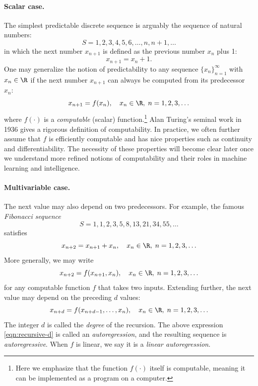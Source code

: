 \documentclass[../../book-main.tex]{subfiles}
\begin{document}
\paragraph{Scalar case.} The simplest predictable discrete sequence
is arguably the sequence of natural numbers:
\begin{equation}
    S = 1, 2, 3, 4, 5, 6, \ldots, n, n+1, \ldots
\end{equation}
in which the next number \(x_{n+1}\) is defined as the previous
number \(x_{n}\) plus 1:
\begin{equation}
    x_{n+1} = x_{n} + 1.
\end{equation}
One may generalize the notion of predictability to any sequence
\(\{x_{n}\}_{n=1}^{\infty}\) with \(x_{n} \in \R\) if the next number
\(x_{n+1}\) can always be computed from its predecessor \(x_{n}\):
\begin{equation}
    x_{n+1} = f(x_{n}), \quad x_{n} \in \R, \; n = 1, 2, 3, \ldots
\end{equation}
where \(f(\cdot)\) is a \textit{computable} (scalar)
function.\footnote{Here we emphasize that the function \(f(\cdot)\)
    itself is computable, meaning it can be implemented as a program on a
computer.} Alan Turing's seminal work in 1936 \cite{Turing-1936}
gives a rigorous definition of computability. In practice, we often
further assume that \(f\) is efficiently computable and has nice
properties such as continuity and differentiability. The necessity of
these properties will become clear later once we understand more
refined notions of computability and their roles in machine learning
and intelligence.

\paragraph{Multivariable case.}
The next value may also depend on two predecessors. For example, the
famous \textit{Fibonacci sequence}
\begin{equation}
    S = 1, 1, 2, 3, 5, 8, 13, 21, 34, 55, \ldots
\end{equation}
satisfies
\begin{equation}
    x_{n+2} = x_{n+1} + x_{n}, \quad x_{n} \in \R, \; n = 1, 2, 3, \ldots
\end{equation}
More generally, we may write
\begin{equation}
    x_{n+2} = f(x_{n+1}, x_{n}), \quad x_{n} \in \R, \; n = 1, 2, 3, \ldots
\end{equation}
for any computable function \(f\) that takes two inputs. Extending
further, the next value may depend on the preceding \(d\) values:
\begin{equation}
    x_{n+d} = f(x_{n+d-1}, \ldots, x_{n}), \quad x_{n} \in \R, \; n =
    1, 2, 3, \ldots
    \label{eqn:recursive-d}
\end{equation}
The integer \(d\) is called the \textit{degree} of the recursion. The
above expression \eqref{eqn:recursive-d} is called an
\textit{autoregression}, and the resulting sequence is
\textit{autoregressive}. When \(f\) is linear, we say it is a
\textit{linear autoregression}.
\end{document}

